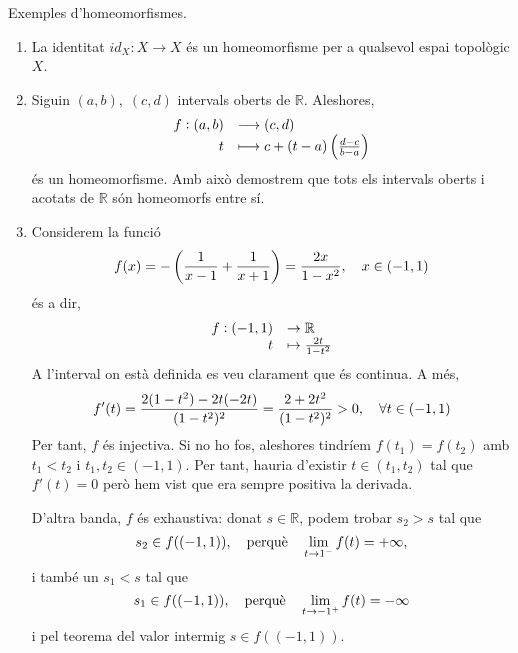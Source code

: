 \documentclass[../main.tex]{subfiles}
\begin{document}
\begin{ej}
\label{ej:exempleshomeomorfismes} Exemples d'homeomorfismes.
\begin{enumerate}[(1)]
    \item La identitat $id_X:X\rightarrow X$ és un homeomorfisme per a qualsevol espai topològic $X$.
    \item Siguin $(a,b),\;(c,d)$ intervals oberts de $\mathbb{R}$. Aleshores,
    \begin{equation}
        \notag
        \begin{array}{rl}
            f:(a,b) & \longrightarrow (c,d) \\
            t & \longmapsto c+(t-a)\left(\frac{d-c}{b-a}\right)
        \end{array}
    \end{equation}
    és un homeomorfisme. Amb això demostrem que tots els intervals oberts i acotats de $\mathbb{R}$ són homeomorfs entre sí.
    
    \item Considerem la funció
    \begin{equation}
        \notag
        f(x) = -\left(\frac{1}{x-1}+\frac{1}{x+1}\right) = \frac{2x}{1-x^2},\quad x\in (-1,1)
    \end{equation}
    és a dir,
    \begin{equation}
        \notag
        \begin{array}{rl}
            f:(-1,1) & \rightarrow \mathbb{R} \\
            t & \mapsto \frac{2t}{1-t^2}
        \end{array}
    \end{equation}
    A l'interval on està definida es veu clarament que és continua. A més,
    \begin{equation}
        \notag
        f'(t) = \frac{2(1-t^2)-2t(-2t)}{(1-t^2)^2} = \frac{2+2t^2}{(1-t^2)^2} >0,\quad \forall t\in(-1,1)
    \end{equation}
    Per tant, $f$ és injectiva. Si no ho fos, aleshores tindríem $f(t_1) = f(t_2)$ amb $t_1<t_2$ i $t_1,t_2\in (-1,1)$. Per tant, hauria d'existir $t\in(t_1,t_2)$ tal que $f'(t) = 0$ però hem vist que era sempre positiva la derivada.
    
    D'altra banda, $f$ és exhaustiva: donat $s\in\mathbb{R}$, podem trobar $s_2>s$ tal que 
    \begin{equation}
        \notag
        s_2\in f((-1,1)),\quad \text{perquè}\quad \lim_{t\rightarrow 1^-}f(t) = +\infty,
    \end{equation}
    i també un $s_1<s$ tal que 
    \begin{equation}
        \notag
        s_1\in f((-1,1)),\quad \text{perquè} \quad \lim_{t\rightarrow -1^+} f(t) = -\infty
    \end{equation}
    i pel teorema del valor intermig $s\in f((-1,1))$.
    

\end{enumerate}
\end{ej}
\end{document}
